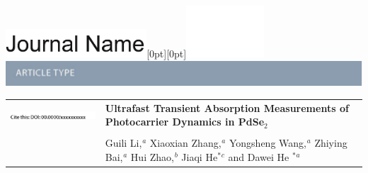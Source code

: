 \documentclass[twoside,twocolumn,9pt]{article}
\begin{document}
  \begin{@twocolumnfalse}
{\includegraphics[height=30pt]{head_foot/journal_name}\hfill\raisebox{0pt}[0pt][0pt]{\includegraphics[height=55pt]{head_foot/RSC_LOGO_CMYK}}\\[1ex]
\includegraphics[width=18.5cm]{head_foot/header_bar}}\par
\vspace{1em}
\sffamily
\begin{tabular}{m{4.5cm} p{13.5cm} }

\includegraphics{head_foot/DOI} & \noindent\LARGE{\textbf{Ultrafast Transient Absorption Measurements of Photocarrier Dynamics in PdSe$_2$}} \\%
\vspace{0.3cm} & \vspace{0.3cm} \\

 & \noindent\large{Guili Li,$^{}$\textit{$^{a}$} Xiaoxian Zhang,$^{}$\textit{$^{a}$} Yongsheng Wang,$^{}$\textit{$^{a}$} Zhiying Bai,$^{}$\textit{$^{a}$} Hui Zhao,$^{}$\textit{$^{b}$} Jiaqi He$^{\ast}$\textit{$^{c}$}  and Dawei He $^{\ast}$\textit{$^{a}$} } \\%


\end{tabular}
\end{@twocolumnfalse}
\end{document}
